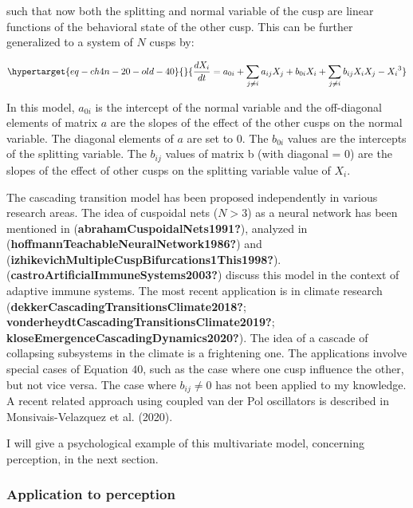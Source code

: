 \documentclass[
  a4paper,
  DIV=11,
  numbers=noendperiod,
  oneside]{scrreprt}
\begin{document}
such that now both the splitting and normal variable of the cusp are
linear functions of the behavioral state of the other cusp. This can be
further generalized to a system of \(N\) cusps by:

\begin{equation}\protect\hypertarget{eq-ch4n-20-old-40}{}{
\frac{dX_{i}}{dt} = a_{0i} + \sum_{j \neq i}^{}{a_{ij}X_{j}} + b_{0i}X_{i} + \sum_{j \neq i}^{}{b_{ij}X_{i}X_{j}} - {X_{i}}^{3}
}\label{eq-ch4n-20-old-40}\end{equation}

In this model, \(a_{0i}\) is the intercept of the normal variable and
the off-diagonal elements of matrix \(a\) are the slopes of the effect
of the other cusps on the normal variable. The diagonal elements of
\(a\) are set to 0. The \(b_{0i}\) values are the intercepts of the
splitting variable. The \(b_{ij}\) values of matrix b (with diagonal =
0) are the slopes of the effect of other cusps on the splitting variable
value of \(X_{i}\).

The cascading transition model has been proposed independently in
various research areas. The idea of cuspoidal nets (\(N>3\)) as a neural
network has been mentioned in (\textbf{abrahamCuspoidalNets1991?}),
analyzed in (\textbf{hoffmannTeachableNeuralNetwork1986?}) and
(\textbf{izhikevichMultipleCuspBifurcations1This1998?}).
(\textbf{castroArtificialImmuneSystems2003?}) discuss this model in the
context of adaptive immune systems. The most recent application is in
climate research (\textbf{dekkerCascadingTransitionsClimate2018?};
\textbf{vonderheydtCascadingTransitionsClimate2019?};
\textbf{kloseEmergenceCascadingDynamics2020?}). The idea of a cascade of
collapsing subsystems in the climate is a frightening one. The
applications involve special cases of Equation \(40\), such as the case
where one cusp influence the other, but not vice versa. The case where
\(b_{ij} \neq 0\) has not been applied to my knowledge. A recent related
approach using coupled van der Pol oscillators is described in
Monsivais-Velazquez et al. (2020).

I will give a psychological example of this multivariate model,
concerning perception, in the next section.

\hypertarget{sec-Application-to-perception}{%
\subsubsection{Application to
perception}\label{sec-Application-to-perception}}
\end{document}
